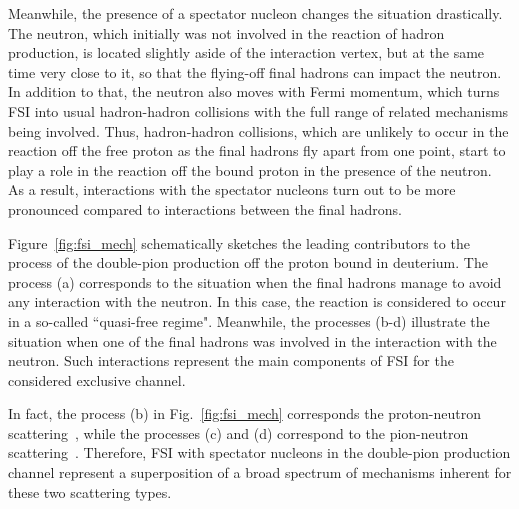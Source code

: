 Meanwhile, the presence of a spectator nucleon changes the situation drastically. The neutron, which initially was not involved in the reaction of hadron production, is located slightly aside of the interaction vertex, but at the same time very close to it, so that the flying-off final hadrons can impact the neutron. In addition to that, the neutron also moves with Fermi momentum, which turns FSI into usual hadron-hadron collisions with the full range of related mechanisms being involved. Thus, hadron-hadron collisions, which are unlikely to occur in the reaction off the free proton as the final hadrons fly apart from one point, start to play a role in the reaction off the bound proton in the presence of the neutron. As a result, interactions with the spectator nucleons turn out to be more pronounced compared to interactions between the final hadrons.


Figure~\ref{fig:fsi_mech} schematically sketches the leading contributors to the process of the double-pion production off the proton bound in deuterium. The process (a) corresponds to the situation when the final hadrons manage to avoid any interaction with the neutron. In this case, the reaction is considered to occur in a so-called ``quasi-free regime". Meanwhile, the processes (b-d) illustrate the situation when one of the final hadrons was involved in the interaction with the neutron. Such interactions represent the main components of FSI for the considered exclusive channel.

In fact, the process (b) in Fig.~\ref{fig:fsi_mech} corresponds the proton-neutron scattering~\cite{Shirokov_Yudin:1980,PhysRev.75.705}, while the processes (c) and (d) correspond to the pion-neutron scattering~\cite{PhysRevD.20.2804,Gasparyan:2003fp,Vrana:1999nt}. Therefore, FSI with spectator nucleons in the double-pion production channel represent a superposition of a broad spectrum of mechanisms inherent for these two scattering types.


